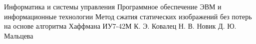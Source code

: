 \makethesistitle
{Информатика и системы управления}
{Программное обеспечение ЭВМ и информационные технологии}
{Метод сжатия статических изображений без потерь на основе алгоритма Хаффмана}
{ИУ7-42М}
{К. Э. Ковалец}
{Н. В. Новик}
{Д. Ю. Мальцева}
